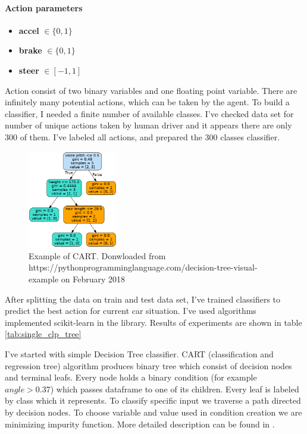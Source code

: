 \documentclass[declaration,shortabstract,english,inz]{iithesis}
\begin{document}
\paragraph{Action parameters}
\begin{itemize}
    \item \textbf{accel} $\in \{0,1\}$
    \item \textbf{brake} $\in \{0,1\}$ 
    \item \textbf{steer} $\in [-1,1]$
\end{itemize}

Action consist of two binary variables and one floating point variable. There are infinitely many potential actions, which can be taken by the agent. To build a classifier, I needed a finite number of available classes. I've checked data set for number of unique actions taken by human driver and it appears there are only 300 of them. I've labeled all actions, and prepared the 300 classes classifier.

\begin{figure}
    \includegraphics[width=0.35\textwidth]{img/tree.png}
    \caption{Example of CART. Donwloaded from https://pythonprogramminglanguage.com/decision-tree-visual-example on February 2018 \cite{scrc_manual}}
    \label{fig:CART}
\end{figure}

After splitting the data on train and test data set, I've trained classifiers to predict the best action for current car situation.
I've used algorithms implemented scikit-learn in the \cite{scikit_learn} library.
Results of experiments are shown in table \ref{tab:single_clp_tree}

I've started with simple Decision Tree classifier.
CART (classification and regression tree) algorithm produces binary tree which consist of decision nodes and terminal leafs.
Every node holds a binary condition (for example $\textit{angle} > 0.37$) which passes dataframe to one of its children.
Every leaf is labeled by class which it represents.
To classify specific input we traverse a path directed by decision nodes.
To choose variable and value used in condition creation we are minimizing impurity function.
More detailed description can be found in \cite{Introduction_ML}.
\end{document}
